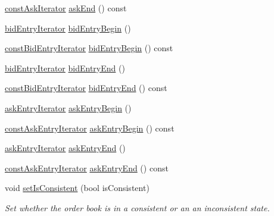\begin{CompactItemize}
\item 
\hyperlink{classWombat_1_1MamdaOrderBook_1_1askIterator}{const\-Ask\-Iterator} \hyperlink{classWombat_1_1MamdaOrderBook_34287a045850ebb23f5671e4d2d0a487}{ask\-End} () const 
\item 
\hyperlink{classWombat_1_1MamdaOrderBook_1_1bidEntryIterator}{bid\-Entry\-Iterator} \hyperlink{classWombat_1_1MamdaOrderBook_a3d424fefe6684e170048cb653eef1fb}{bid\-Entry\-Begin} ()
\item 
\hyperlink{classWombat_1_1MamdaOrderBook_1_1bidEntryIterator}{const\-Bid\-Entry\-Iterator} \hyperlink{classWombat_1_1MamdaOrderBook_7731fa4f9edca3a157253b5200854735}{bid\-Entry\-Begin} () const 
\item 
\hyperlink{classWombat_1_1MamdaOrderBook_1_1bidEntryIterator}{bid\-Entry\-Iterator} \hyperlink{classWombat_1_1MamdaOrderBook_8649cdeddccb23cf9f489e265ce2f96b}{bid\-Entry\-End} ()
\item 
\hyperlink{classWombat_1_1MamdaOrderBook_1_1bidEntryIterator}{const\-Bid\-Entry\-Iterator} \hyperlink{classWombat_1_1MamdaOrderBook_382d2a24e1ea06d23b668b42f71a4ca0}{bid\-Entry\-End} () const 
\item 
\hyperlink{classWombat_1_1MamdaOrderBook_1_1askEntryIterator}{ask\-Entry\-Iterator} \hyperlink{classWombat_1_1MamdaOrderBook_1a19f53739ca3873b45b0e3d32f1a318}{ask\-Entry\-Begin} ()
\item 
\hyperlink{classWombat_1_1MamdaOrderBook_1_1askEntryIterator}{const\-Ask\-Entry\-Iterator} \hyperlink{classWombat_1_1MamdaOrderBook_e4a92934786bd1dbde7e8d1f8c78aa79}{ask\-Entry\-Begin} () const 
\item 
\hyperlink{classWombat_1_1MamdaOrderBook_1_1askEntryIterator}{ask\-Entry\-Iterator} \hyperlink{classWombat_1_1MamdaOrderBook_118d2f41641f35259a0f0fad815426e9}{ask\-Entry\-End} ()
\item 
\hyperlink{classWombat_1_1MamdaOrderBook_1_1askEntryIterator}{const\-Ask\-Entry\-Iterator} \hyperlink{classWombat_1_1MamdaOrderBook_33638ee5601d031be5428b5e56e8641b}{ask\-Entry\-End} () const 
\item 
void \hyperlink{classWombat_1_1MamdaOrderBook_eb98ce2769476a0051efc840bcf5fd27}{set\-Is\-Consistent} (bool is\-Consistent)
\begin{CompactList}\small\item\em Set whether the order book is in a consistent or an an inconsistent state. \item\end{CompactList}\item 

\end{CompactItemize}
